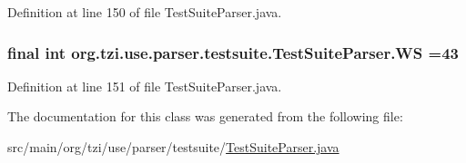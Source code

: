 Definition at line 150 of file Test\-Suite\-Parser.\-java.

\hypertarget{classorg_1_1tzi_1_1use_1_1parser_1_1testsuite_1_1_test_suite_parser_a1121e0f6131402e91e13d4364026a39f}{
\subsubsection[{W\-S}]{\setlength{\rightskip}{0pt plus 5cm}final int org.\-tzi.\-use.\-parser.\-testsuite.\-Test\-Suite\-Parser.\-W\-S =43\hspace{0.3cm}{\ttfamily [static]}}}\label{classorg_1_1tzi_1_1use_1_1parser_1_1testsuite_1_1_test_suite_parser_a1121e0f6131402e91e13d4364026a39f}


Definition at line 151 of file Test\-Suite\-Parser.\-java.



The documentation for this class was generated from the following file\-:\begin{DoxyCompactItemize}
\item 
src/main/org/tzi/use/parser/testsuite/\hyperlink{_test_suite_parser_8java}{Test\-Suite\-Parser.\-java}\end{DoxyCompactItemize}
